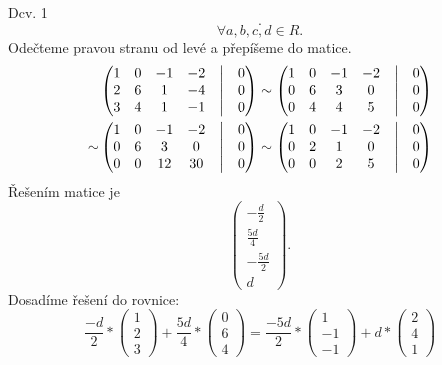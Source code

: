 \documentclass[a4paper]{article}
\begin{document}
\begin{section}{Dcv. 1}
\[            .\] 
            \[
            \forall a,b,c,d \in R
            .\] 
            Odečteme pravou stranu od levé a přepíšeme do matice.
            \begin{align*}
                &\begin{pmatrix}
                    1 & 0 & -1 & -2 & \bigm| & 0 \\
                    2 & 6 & 1 & -4 & \bigm| & 0 \\
                    3 & 4 & 1 & -1 & \bigm| & 0
                \end{pmatrix}
                \sim
                \begin{pmatrix}
                    1 & 0 & -1 & -2 & \bigm| & 0 \\
                    0 & 6 & 3 & 0 & \bigm| & 0 \\
                    0 & 4 & 4 & 5 & \bigm| & 0
                \end{pmatrix}
                \\
                \sim
                &\begin{pmatrix}
                    1 & 0 & -1 & -2 & \bigm| & 0 \\
                    0 & 6 & 3 & 0 & \bigm| & 0 \\
                    0 & 0 & 12 & 30 & \bigm| & 0
                \end{pmatrix}
                \sim
                \begin{pmatrix}
                    1 & 0 & -1 & -2 & \bigm| & 0 \\
                    0 & 2 & 1 & 0 & \bigm| & 0 \\
                    0 & 0 & 2 & 5 & \bigm| & 0
                \end{pmatrix}
            \end{align*}
            Řešením matice je \[
                \begin{pmatrix} -\frac{d}{2} \\ \frac{5d}{4} \\ -\frac{5d}{2} \\ d  \end{pmatrix} 
            .\] 
            Dosadíme řešení do rovnice: \[
                \frac{-d}{2}*\begin{pmatrix} 1 \\ 2 \\ 3\end{pmatrix} + \frac{5d}{4}*\begin{pmatrix} 0 \\ 6 \\ 4 \end{pmatrix} = \frac{-5d}{2}*\begin{pmatrix} 1 \\ -1 \\ -1 \end{pmatrix} + d*\begin{pmatrix} 2 \\ 4 \\1 \end{pmatrix}
\]
\end{section}
\end{document}
